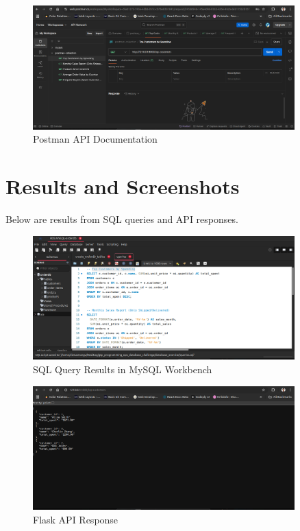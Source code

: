 \documentclass[12pt]{article}
\begin{document}
\begin{figure}[H]
\centering
\includegraphics[width=0.9\textwidth]{screenshots/postman_api_docs.png}
\caption{Postman API Documentation}
\end{figure}

\section{Results and Screenshots}
Below are results from SQL queries and API responses.

\begin{figure}[H]
\centering
\includegraphics[width=0.9\textwidth]{screenshots/workbench_queries.png}
\caption{SQL Query Results in MySQL Workbench}
\end{figure}

\begin{figure}[H]
\centering
\includegraphics[width=0.9\textwidth]{screenshots/flask_response.png}
\caption{Flask API Response}
\end{figure}
\end{document}
